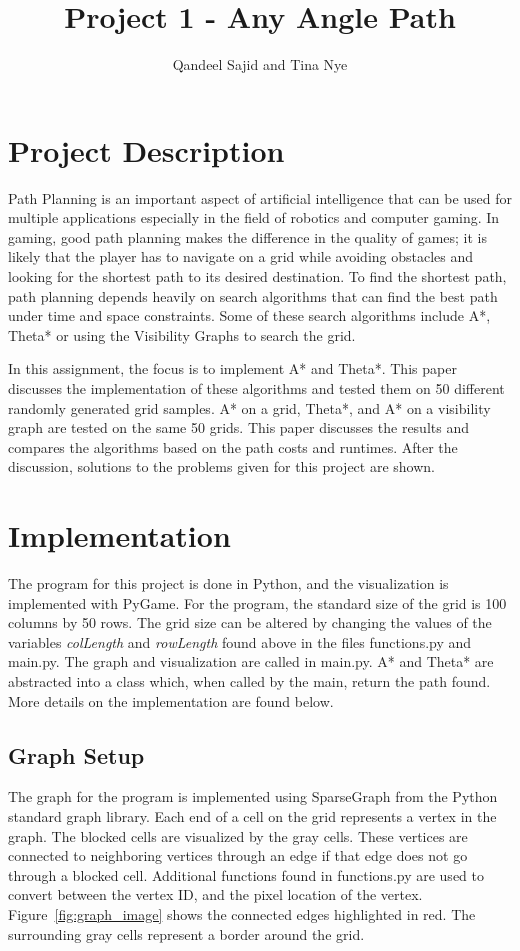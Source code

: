 \documentclass[a4paper,11pt]{report}
\title{Project 1 - Any Angle Path}
\author{Qandeel Sajid and Tina Nye}
\begin{document}
\maketitle

\newpage
\tableofcontents
\newpage

\section{Project Description}
Path Planning is an important aspect of artificial intelligence that can be used for multiple applications especially in the field of robotics and computer gaming. In gaming, good path planning makes the difference in the quality of games; it is likely that the player has to navigate on a grid while avoiding obstacles and looking for the shortest path to its desired destination. To find the shortest path, path planning depends heavily on search algorithms that can find the best path under time and space constraints. Some of these search algorithms include A*, Theta* or using the Visibility Graphs to search the grid.

In this assignment, the focus is to implement A* and Theta*. This paper discusses the implementation of these algorithms and tested them on 50 different randomly generated grid samples. A* on a grid, Theta*, and A* on a visibility graph are tested on the same 50 grids. This paper discusses the results and compares the algorithms based on the path costs and runtimes. After the discussion, solutions to the problems given for this project are shown.
 
\section{Implementation}
The program for this project is done in Python, and the visualization is implemented with PyGame. For the program, the standard size of the grid is 100 columns by 50 rows. The grid size can be altered by changing the values of the variables \textit{colLength} and \textit{rowLength} found above in the files functions.py and main.py. The graph and visualization are called in main.py. A* and Theta* are abstracted into a class which, when called by the main, return the path found. More details on the implementation are found below.
	\subsection{Graph Setup}
	The graph for the program is implemented using SparseGraph from the Python standard graph library. Each end of a cell on the grid represents a vertex in the graph. The blocked cells are visualized by the gray cells. These vertices are connected to neighboring vertices through an edge if that edge does not go through a blocked cell. Additional functions found in functions.py are used to convert between the vertex ID, and the pixel location of the vertex. Figure~\ref{fig:graph_image} shows the connected edges highlighted in red. The surrounding gray cells represent a border around the grid.
	
\end{document}
